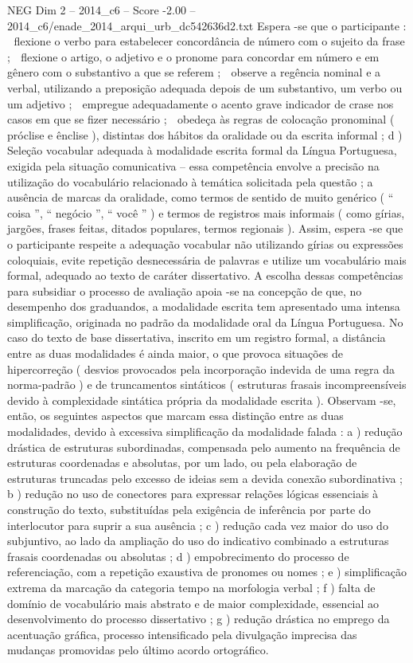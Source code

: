 \begin{textsample}{NEG Dim 2 – 2014\_c6 – Score -2.00 – 2014\_c6/enade\_2014\_arqui\_urb\_dc542636d2.txt}
Espera -se que o participante :  flexione o verbo para estabelecer concordância de número com o sujeito da frase ;  flexione o artigo, o adjetivo e o pronome para concordar em número e em gênero com o substantivo a que se referem ;  observe a regência nominal e a verbal, utilizando a preposição adequada depois de um substantivo, um verbo ou um adjetivo ;  empregue adequadamente o acento grave indicador de crase nos casos em que se fizer necessário ;  obedeça às regras de colocação pronominal ( próclise e ênclise ), distintas dos hábitos da oralidade ou da escrita informal ; d ) Seleção vocabular adequada à modalidade escrita formal da Língua Portuguesa, exigida pela situação comunicativa – essa competência envolve a precisão na utilização do vocabulário relacionado à temática solicitada pela questão ; a ausência de marcas da oralidade, como termos de sentido de muito genérico ( “ coisa ”, “ negócio ”, “ você ” ) e termos de registros mais informais ( como gírias, jargões, frases feitas, ditados populares, termos regionais ).
Assim, espera -se que o participante respeite a adequação vocabular não utilizando gírias ou expressões coloquiais, evite repetição desnecessária de palavras e utilize um vocabulário mais formal, adequado ao texto de caráter dissertativo.
A escolha dessas competências para subsidiar o processo de avaliação apoia -se na concepção de que, no desempenho dos graduandos, a modalidade escrita tem apresentado uma intensa simplificação, originada no padrão da modalidade oral da Língua Portuguesa.
No caso do texto de base dissertativa, inscrito em um registro formal, a distância entre as duas modalidades é ainda maior, o que provoca situações de hipercorreção ( desvios provocados pela incorporação indevida de uma regra da norma-padrão ) e de truncamentos sintáticos ( estruturas frasais incompreensíveis devido à complexidade sintática própria da modalidade escrita ).
Observam -se, então, os seguintes aspectos que marcam essa distinção entre as duas modalidades, devido à excessiva simplificação da modalidade falada : a ) redução drástica de estruturas subordinadas, compensada pelo aumento na frequência de estruturas coordenadas e absolutas, por um lado, ou pela elaboração de estruturas truncadas pelo excesso de ideias sem a devida conexão subordinativa ; b ) redução no uso de conectores para expressar relações lógicas essenciais à construção do texto, substituídas pela exigência de inferência por parte do interlocutor para suprir a sua ausência ; c ) redução cada vez maior do uso do subjuntivo, ao lado da ampliação do uso do indicativo combinado a estruturas frasais coordenadas ou absolutas ; d ) empobrecimento do processo de referenciação, com a repetição exaustiva de pronomes ou nomes ; e ) simplificação extrema da marcação da categoria tempo na morfologia verbal ; f ) falta de domínio de vocabulário mais abstrato e de maior complexidade, essencial ao desenvolvimento do processo dissertativo ; g ) redução drástica no emprego da acentuação gráfica, processo intensificado pela divulgação imprecisa das mudanças promovidas pelo último acordo ortográfico.

\end{textsample}
